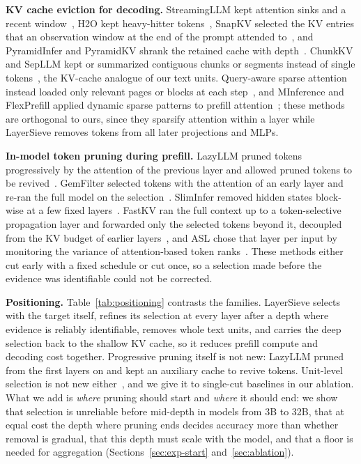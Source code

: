 \documentclass[10pt,conference]{IEEEtran}
\begin{document}
\textbf{KV cache eviction for decoding.}
StreamingLLM kept attention sinks and a recent window~\cite{xiao2024efficient}, H2O kept heavy-hitter tokens~\cite{zhang2024h2o}, SnapKV selected the KV entries that an observation window at the end of the prompt attended to~\cite{li2024snapkv}, and PyramidInfer and PyramidKV shrank the retained cache with depth~\cite{yang2024pyramidinfer,cai2024pyramidkv}. ChunkKV and SepLLM kept or summarized contiguous chunks or segments instead of single tokens~\cite{liu2025chunkkv,chen2025sepllm}, the KV-cache analogue of our text units. Query-aware sparse attention instead loaded only relevant pages or blocks at each step~\cite{tang2024quest,xiao2024infllm}, and MInference and FlexPrefill applied dynamic sparse patterns to prefill attention~\cite{jiang2024minference,lai2025flexprefill}; these methods are orthogonal to ours, since they sparsify attention within a layer while LayerSieve removes tokens from all later projections and MLPs.

\textbf{In-model token pruning during prefill.}
LazyLLM pruned tokens progressively by the attention of the previous layer and allowed pruned tokens to be revived~\cite{fu2024lazyllm}. GemFilter selected tokens with the attention of an early layer and re-ran the full model on the selection~\cite{shi2024gemfilter}. SlimInfer removed hidden states block-wise at a few fixed layers~\cite{long2026sliminfer}. FastKV ran the full context up to a token-selective propagation layer and forwarded only the selected tokens beyond it, decoupled from the KV budget of earlier layers~\cite{jo2026fastkv}, and ASL chose that layer per input by monitoring the variance of attention-based token ranks~\cite{taniguchi2026asl}. These methods either cut early with a fixed schedule or cut once, so a selection made before the evidence was identifiable could not be corrected.

\textbf{Positioning.}
Table~\ref{tab:positioning} contrasts the families. LayerSieve selects with the target itself, refines its selection at every layer after a depth where evidence is reliably identifiable, removes whole text units, and carries the deep selection back to the shallow KV cache, so it reduces prefill compute and decoding cost together. Progressive pruning itself is not new: LazyLLM pruned from the first layers on and kept an auxiliary cache to revive tokens. Unit-level selection is not new either~\cite{liu2025chunkkv,chen2025sepllm}, and we give it to single-cut baselines in our ablation. What we add is \emph{where} pruning should start and \emph{where} it should end: we show that selection is unreliable before mid-depth in models from 3B to 32B, that at equal cost the depth where pruning ends decides accuracy more than whether removal is gradual, that this depth must scale with the model, and that a floor is needed for aggregation (Sections~\ref{sec:exp-start} and~\ref{sec:ablation}).
\end{document}
